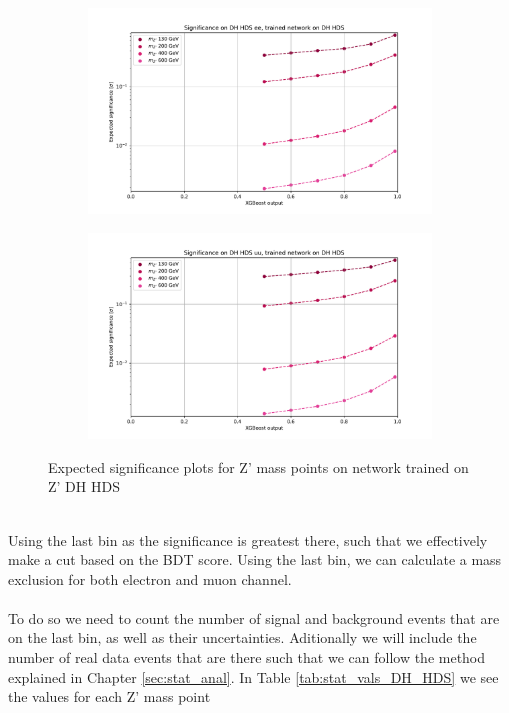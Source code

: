 \documentclass[14pt, a4paper]{book}
\begin{document}
\begin{figure}[!ht]
	\centering
	\begin{subfigure}[b]{0.49\textwidth}
      \centering
      \includegraphics[width=1\textwidth]{XGBoost/DH_HDS/EXP_SIG_ee.pdf}
      \end{subfigure}
   \hfill
   \begin{subfigure}[b]{0.49\textwidth}
      \centering
      \includegraphics[width=1\textwidth]{XGBoost/DH_HDS/EXP_SIG_uu.pdf}
      \end{subfigure}
   \caption{Expected significance plots for Z' mass points on network trained on Z' DH HDS}\label{fig:DH_HDS_exp_sig}
\end{figure}
\\Using the last bin as the significance is greatest there, such that we effectively make a cut based on the BDT score. Using the last bin, we can calculate a mass exclusion for both electron and muon channel.\\
\\To do so we need to count the number of signal and background events that are on the last bin, as well as their uncertainties. Aditionally we will include the number of real data events that are there such that we can follow the 
method explained in Chapter \ref{sec:stat_anal}. In Table \ref{tab:stat_vals_DH_HDS} we see the values for each Z' mass point
\end{document}

